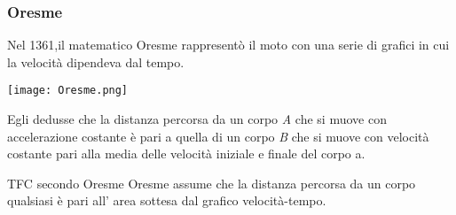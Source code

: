 \begin{frame}[label=Oresme]
  \frametitle{Oresme}
    Nel 1361,il matematico Oresme rappresentò il moto con una serie
    di grafici in cui \alert{la velocità} dipendeva dal \alert{tempo}.
    \begin{center}
    \texttt{[image: Oresme.png]}    
    \end{center}
    \pause
    Egli dedusse che la distanza percorsa da un corpo \textit{A} che si muove con 
    accelerazione costante è pari a quella di un corpo \textit{B} che si muove con 
    velocità costante pari alla media delle velocità iniziale e finale del corpo a.
    \pause
    \begin{block}{TFC secondo Oresme}
      Oresme assume che la distanza percorsa da un corpo qualsiasi è pari
      all' \alert{area} sottesa dal grafico velocità-tempo.
    \end{block}  
  
  \end{frame}